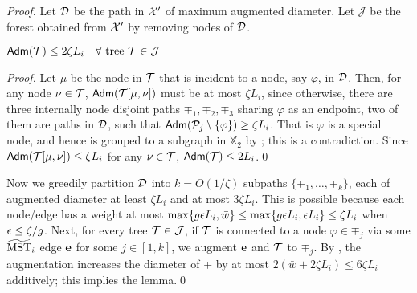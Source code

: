 \begin{proof}
	Let $\mathcal{D}$ be the path in $\mathcal{X}'$ of maximum augmented diameter. Let $\mathcal{J}$ be the forest obtained from  $\mathcal{X}'$ by removing nodes of $\mathcal{D}$. 
	
	\begin{claim}\label{clm:diameter-J} $\mathsf{Adm}(\mathcal{T}) \leq 2\zeta L_i \quad \forall \mbox{ tree } \mathcal{T} \in \mathcal{J} $
	\end{claim}
	\begin{proof}
		Let $\mu$ be the node in $\mathcal{T}$ that is incident to a node, say $\varphi$, in $\mathcal{D}$. Then, for any node $\nu \in \mathcal{T}$, $\mathsf{Adm}(\mathcal{T}[\mu,\nu])$ must be at most $\zeta L_i$, since otherwise, there are three internally node disjoint paths $\mp_1,\mp_2,\mp_3$  sharing $\varphi$ as an endpoint, two of them are paths in $\mathcal{D}$, such that $\mathsf{Adm}(\mathcal{P}_j\setminus \{\varphi\})\geq \zeta L_i$. That is $\varphi$ is a special node, and hence is grouped to a subgraph in $\mathbb{X}_2$ by ; this is a contradiction. Since  $\mathsf{Adm}(\mathcal{T}[\mu,\nu]) \leq \zeta L_i$ for any $\nu\in \mathcal{T}$, $\mathsf{Adm}(\mathcal{T})\leq 2L_i$.\qed
	\end{proof}
	
	Now we greedily partition $\mathcal{D}$ into $k = O(1/\zeta)$ subpaths $\{\mp_1,\ldots, \mp_k\}$, each of augmented diameter at least $\zeta L_i$ and at most $3\zeta L_i$. This is possible because each node/edge has a weight at most $\max\{g\epsilon L_i,\bar{w}\} \leq \max\{g\epsilon L_i,\epsilon L_i\} \leq \zeta L_i$ when $\epsilon \leq \zeta/g$. Next, for every tree $\mathcal{T} \in \mathcal{J}$, if $\mathcal{T}$ is connected to a node $\varphi \in \mp_j$ via some $\widetilde{\mathrm{MST}}_{i}$ edge $\mathbf{e}$ for some $j \in [1,k]$, we augment $\mathbf{e}$ and $\mathcal{T}$ to $\mp_j$.   By  , the augmentation increases the diameter of $\mp$ by at most $2(\bar{w} + 2\zeta L_i)\leq 6\zeta L_i$ additively; this implies the lemma.\qed
\end{proof}


